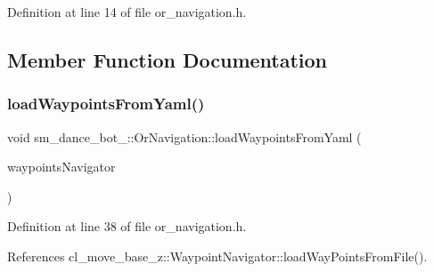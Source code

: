 Definition at line 14 of file or\+\_\+navigation.\+h.



\subsection{Member Function Documentation}
\mbox{\label{classsm__dance__bot__2_1_1OrNavigation_a663fc206de1964058c851f521279ca34}} 
\subsubsection{\texorpdfstring{load\+Waypoints\+From\+Yaml()}{loadWaypointsFromYaml()}}
{\footnotesize\ttfamily void sm\+\_\+dance\+\_\+bot\+\_\+::\+Or\+Navigation\+::load\+Waypoints\+From\+Yaml (\begin{DoxyParamCaption}\item[{\hyperlink{classcl__move__base__z_1_1WaypointNavigator}{Waypoint\+Navigator} $\ast$}]{waypoints\+Navigator }\end{DoxyParamCaption})\hspace{0.3cm}{\ttfamily [inline]}}



Definition at line 38 of file or\+\_\+navigation.\+h.



References cl\+\_\+move\+\_\+base\+\_\+z\+::\+Waypoint\+Navigator\+::load\+Way\+Points\+From\+File().


